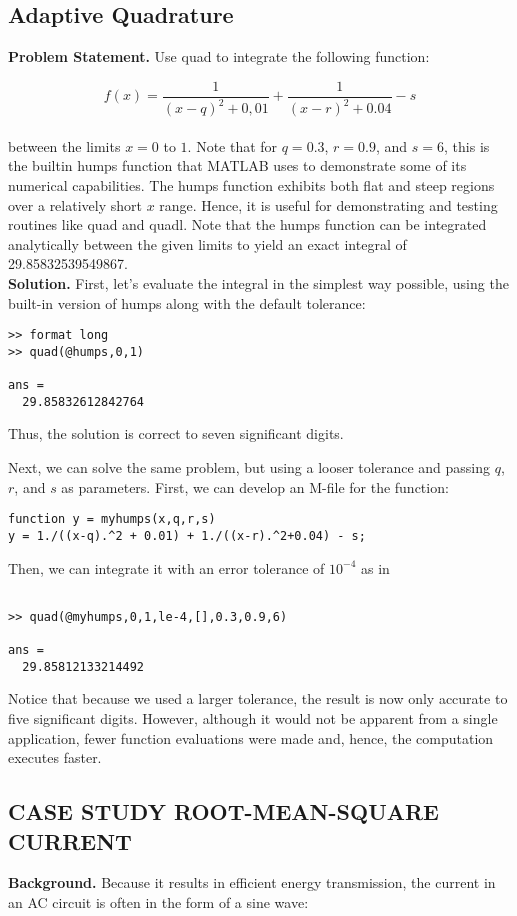 \documentclass[../main.tex]{subfiles}
\begin{document}
\subsection{Adaptive Quadrature}
\textbf{Problem Statement.} Use quad to integrate the following function:

	$$f(x) = \dfrac{1}{(x-q)^{2} +0,01} + \dfrac{1}{(x-r)^{2}+0.04} - s$$\\
between the limits $x = 0$ to $1$. Note that for $q = 0.3$, $r = 0.9$, and $s = 6$, this is the builtin humps function that MATLAB uses to demonstrate some of its numerical capabilities.
The humps function exhibits both flat and steep regions over a relatively short $x$ range.
Hence, it is useful for demonstrating and testing routines like quad and quadl. Note that
the humps function can be integrated analytically between the given limits to yield an exact
integral of 29.85832539549867.\\
\vspace{0.2in}
\textbf{Solution.} First, let's evaluate the integral in the simplest way possible, using the built-in
version of humps along with the default tolerance:
\begin{verbatim}
>> format long
>> quad(@humps,0,1)

ans =
  29.85832612842764
\end{verbatim}
Thus, the solution is correct to seven significant digits.

Next, we can solve the same problem, but using a looser tolerance and passing $q$, $r$, and
$s$ as parameters. First, we can develop an M-file for the function:
\begin{verbatim}
function y = myhumps(x,q,r,s)
y = 1./((x-q).^2 + 0.01) + 1./((x-r).^2+0.04) - s;
\end{verbatim}
Then, we can integrate it with an error tolerance of $10^{−4}$ as in
\begin{verbatim}

>> quad(@myhumps,0,1,le-4,[],0.3,0.9,6)

ans =
  29.85812133214492
\end{verbatim}
Notice that because we used a larger tolerance, the result is now only accurate to five significant digits. However, although it would not be apparent from a single application, fewer
function evaluations were made and, hence, the computation executes faster.


\pagebreak

\subsection{CASE STUDY ROOT-MEAN-SQUARE CURRENT}
\textbf{Background.} Because it results in efficient energy transmission, the current in an AC
circuit is often in the form of a sine wave:
\end{document}
